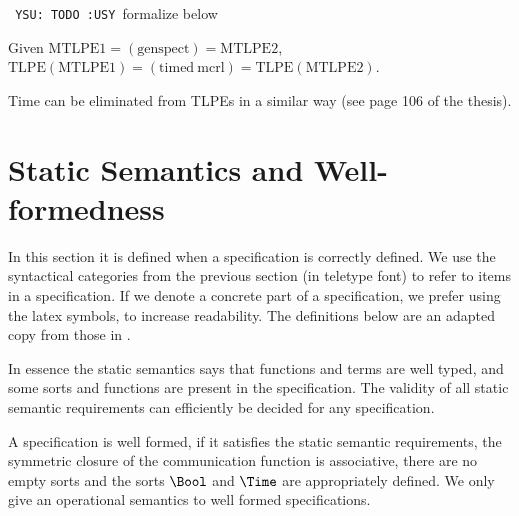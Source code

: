 \documentclass[twoside,fleqn,a4paper,dvips]{article}
\def\YSU{\texttt{ YSU: TODO :USY\marginpar{!!!} }}
\begin{document}
\YSU formalize below

\begin{thm}
  Given 
  $\mathrm{MTLPE1}=(\mathrm{genspect})=\mathrm{MTLPE2}$,\\
  $\mathrm{TLPE(MTLPE1)}=(\mathrm{timed\ mcrl})=\mathrm{TLPE(MTLPE2)}$.
\end{thm}

Time can be eliminated from TLPEs in a similar way (see page 106 of
the thesis).

\appendix
\newpage
\section{Static Semantics and Well-formedness}
\label{section:SSC} 
In this section it is defined when a specification is correctly defined.
We use the syntactical categories from the previous section (in teletype
font) to refer to items in a specification. If we denote a
concrete part of a specification, we prefer using the latex symbols, to
increase readability. The definitions below are an adapted copy from those in
\cite{GroPo94a}.

In
essence the static semantics says that functions and terms are well
typed, and some sorts and functions are present in the specification. The
validity of all static semantic requirements can efficiently be decided for any
specification.

A specification is well formed, if it satisfies the static semantic requirements,
the symmetric closure of the communication function is associative, there are no
empty sorts and the sorts $\Bool$ and $\Time$ are appropriately defined. We
only give an operational semantics to well formed specifications.
\end{document}
